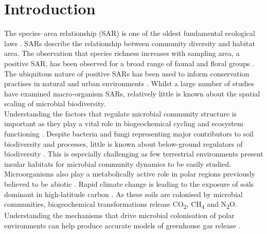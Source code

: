 \chapter{Introduction}

The species--area relationship (SAR) is one of the oldest fundamental ecological laws \cite{GooriahLeanaD2019Sedt}. SARs describe the relationship between community diversity and habitat area. The observation that species richness increases with sampling area, a positive SAR, has been observed for a broad range of faunal \cite{ricklefs1999roles} \cite{lomolino1982species} \cite{eadie1986lakes} and floral groups \cite{zacharias1990species} \cite{price2011phylogenetic}. The ubiquitous nature of positive SARs has been used to inform conservation practises in natural \cite{haila2002conceptual} \cite{samson1980island} and urban environments \cite{davis1978urban}. Whilst a large number of studies have examined macro-organism SARs, relatively little is known about the spatial scaling of microbial biodiversity. \\

{\texorpdfstring
\noindent UUnderstanding the factors that regulate microbial community structure is important as they play a vital role in biogeochemical cycling and ecosystem functioning \cite{griffiths2011bacterial}. Despite bacteria and fungi representing major contributors to soil biodiversity and processes, little is known about below-ground regulators of biodiversity \cite{griffiths2011bacterial} \cite{li2020island}. This is especially challenging as few terrestrial environments present insular habitats for microbial community dynamics to be easily studied. Microorganisms also play a metabolically active role in polar regions previously believed to be abiotic \cite{stibal2020glacial}. Rapid climate change is leading to the exposure of soils dominant in high-latitude carbon \cite{bradley2017microbial}. As these soils are colonised by microbial communities, biogeochemical transformations release CO\textsubscript{2}, CH\textsubscript{4} and N\textsubscript{2}O. Understanding the mechanisms that drive microbial colonisation of polar environments can help produce accurate models of greenhouse gas release \cite{malard2018microbial}.} \\

